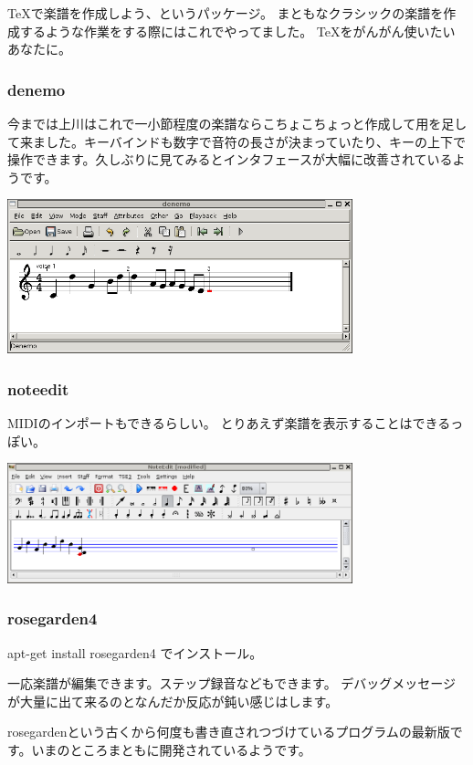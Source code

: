\documentclass[mingoth,a4paper]{jsarticle}
\begin{document}
\TeX で楽譜を作成しよう、というパッケージ。
まともなクラシックの楽譜を作成するような作業をする際にはこれでやってました。
\TeX をがんがん使いたいあなたに。

\subsubsection{denemo}

今までは上川はこれで一小節程度の楽譜ならこちょこちょっと作成して用を足し
て来ました。キーバインドも数字で音符の長さが決まっていたり、キーの上下で
操作できます。久しぶりに見てみるとインタフェースが大幅に改善されているよ
うです。

\includegraphics[width=10cm]{image200602/denemo.png}

\subsubsection{noteedit}

MIDIのインポートもできるらしい。
とりあえず楽譜を表示することはできるっぽい。

\includegraphics[width=10cm]{image200602/noteedit.png}

\subsubsection{rosegarden4}

apt-get install rosegarden4 でインストール。

一応楽譜が編集できます。ステップ録音などもできます。
デバッグメッセージが大量に出て来るのとなんだか反応が鈍い感じはします。

rosegardenという古くから何度も書き直されつづけているプログラムの最新版で
す。いまのところまともに開発されているようです。
\end{document}
